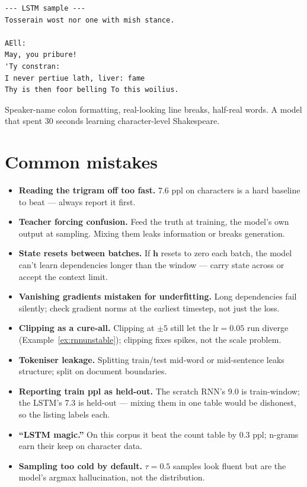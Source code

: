 \begin{example}
\label{ex:lstmsample}
\begin{verbatim}
--- LSTM sample ---
Tosserain wost nor one with mish stance.

AEll:
May, you pribure!
'Ty constran:
I never pertiue lath, liver: fame
Thy is then foor belling To this woilius.
\end{verbatim}
Speaker-name colon formatting, real-looking line breaks, half-real
words. A model that spent 30 seconds learning character-level
Shakespeare.
\end{example}

\section{Common mistakes}
\label{sec:seqmistakes}

\begin{itemize}
\item \textbf{Reading the trigram off too fast.} $7.6$ ppl on
characters is a hard baseline to beat --- always report it first.
\item \textbf{Teacher forcing confusion.} Feed the truth at training,
the model's own output at sampling. Mixing them leaks information or
breaks generation.
\item \textbf{State resets between batches.} If $\mathbf h$ resets to
zero each batch, the model can't learn dependencies longer than the
window --- carry state across or accept the context limit.
\item \textbf{Vanishing gradients mistaken for underfitting.} Long
dependencies fail silently; check gradient norms at the earliest
timestep, not just the loss.
\item \textbf{Clipping as a cure-all.} Clipping at $\pm5$ still let the
lr$=0.05$ run diverge (Example~\ref{ex:rnnunstable}); clipping fixes
spikes, not the scale problem.
\item \textbf{Tokeniser leakage.} Splitting train/test mid-word or
mid-sentence leaks structure; split on document boundaries.
\item \textbf{Reporting train ppl as held-out.} The scratch RNN's 9.0
is train-window; the LSTM's 7.3 is held-out --- mixing them in one
table would be dishonest, so the listing labels each.
\item \textbf{``LSTM magic.''} On this corpus it beat the count table
by 0.3 ppl; n-grams earn their keep on character data.
\item \textbf{Sampling too cold by default.} $\tau{=}0.5$ samples look
fluent but are the model's argmax hallucination, not the
distribution.
\end{itemize}

